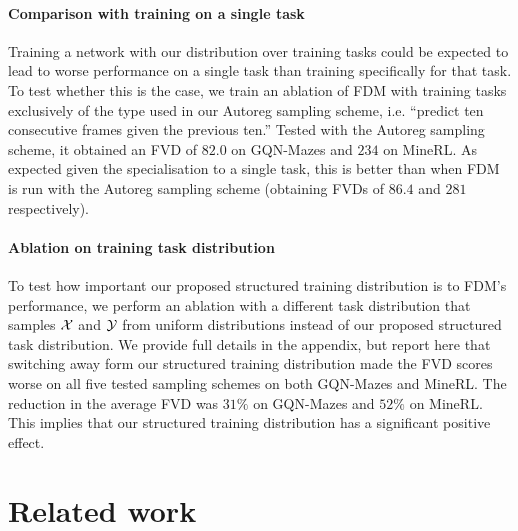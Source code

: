 \paragraph{Comparison with training on a single task}
Training a network with our distribution over training tasks could be expected to lead to worse performance on a single task than training specifically for that task. To test whether this is the case, we train an ablation of FDM with training tasks exclusively of the type used in our Autoreg sampling scheme, i.e. ``predict ten consecutive frames given the previous ten.'' Tested with the Autoreg sampling scheme, it obtained an FVD of $82.0$ on GQN-Mazes and $234$ on MineRL. As expected given the specialisation to a single task, this is better than when FDM is run with the Autoreg sampling scheme (obtaining FVDs of $86.4$ and $281$ respectively).

\paragraph{Ablation on training task distribution}
To test how important our proposed structured training distribution is to FDM's performance, we perform an ablation with a different task distribution that samples $\mathcal{X}$ and $\mathcal{Y}$ from uniform distributions instead of our proposed structured task distribution. 
We provide full details in the appendix, but report here that switching away form our structured training distribution made the FVD scores worse on all five tested sampling schemes on both GQN-Mazes and MineRL. The reduction in the average FVD was $31\%$ on GQN-Mazes and $52\%$ on MineRL. This implies that our structured training distribution has a significant positive effect.

\section{Related work}


